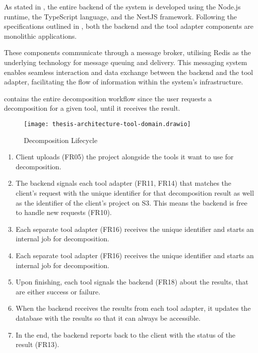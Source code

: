 As stated in , the entire backend of the system is
developed using the Node.js runtime, the TypeScript language, and the NestJS
framework. Following the specifications outlined in ,
both the backend and the tool adapter components are monolithic applications.

These components communicate through a message broker, utilising Redis as the
underlying technology for message queuing and delivery. This messaging system
enables seamless interaction and data exchange between the backend and the tool
adapter, facilitating the flow of information within the system's
infrastructure.

 contains the entire decomposition workflow
since the user requests a decomposition for a given tool, until it receives the
result.

\begin{figure*}[!htb]
  \centering
  \texttt{[image: thesis-architecture-tool-domain.drawio]}
  \caption{Decomposition Lifecycle}
  \label{fig:decomposition_lifecycle}
\end{figure*}

\begin{enumerate}
  \item Client uploads (FR05) the project alongside the tools it want to use
    for decomposition.
  \item The backend signals each tool adapter (FR11, FR14) that matches the
    client's request with the unique identifier for that decomposition result
    as well as the identifier of the client's project on S3. This means the
    backend is free to handle new requests (FR10).
  \item Each separate tool adapter (FR16) receives the unique identifier and
    starts an internal job for decomposition.
  \item Each separate tool adapter (FR16) receives the unique identifier and
    starts an internal job for decomposition.
  \item Upon finishing, each tool signals the backend (FR18) about the results,
    that are either success or failure.
  \item When the backend receives the results from each tool adapter, it
    updates the database with the results so that it can always be accessible.
  \item In the end, the backend reports back to the client with the status of
    the result (FR13).
\end{enumerate}
